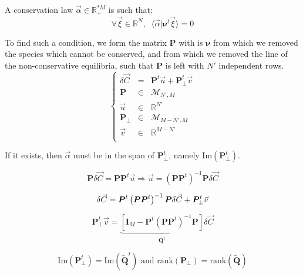 \documentclass[aps,12pt]{revtex4}
\begin{document}
A conservation law $\vec{\alpha}\in\mathbb{R}_+^{*M}$ is such that:
\begin{equation}
	\forall \vec{\xi} \in \mathbb{R}^N, \;\; \langle \vec{\alpha} \vert \bm{\nu}^t \vec{\xi} \rangle = 0
\end{equation}

To find such a condition, we form the matrix $\bm{P}$ with is $\bm{\nu}$ from which we removed the species
which cannot be conserved, and from which we removed the line of the non-conservative equilibria, 
such that $\bm{P}$ is left with $N'$ independent rows.
\begin{equation}
\left \lbrace
\begin{array}{rcl}
\delta\vec{C} & = & \bm{P}^t\vec{u} + \bm{P}_\perp^t \vec{v} \\
\bm{P}       & \in & \mathcal{M}_{N',M}\\
\vec{u}      & \in & \mathbb{R}^{N'}\\
\bm{P}_\perp & \in & \mathcal{M}_{M-N',M}\\
\vec{v}      & \in & \mathbb{R}^{M-N'}     \\
\end{array}
\right .
\end{equation}

If it exists, then $\vec{\alpha}$ must be in the span of $\bm{P}_\perp^t$, namely $\mathrm{Im}\left(\bm{P}_\perp^t\right)$.

\begin{equation}
	\bm{P} \delta \vec{C} = \bm{P}\bm{P}^t\vec{u}
	 \Rightarrow \vec{u} = \left(\bm{P}\bm{P}^t\right)^{-1} \bm{P} \delta \vec{C}
\end{equation}

\begin{equation}
	\delta\vec{C} =  \bm{P}^t\left(\bm{P}\bm{P}^t\right)^{-1} \bm{P} \delta \vec{C} + \bm{P}_\perp^t \vec{v}\\
\end{equation}
	
\begin{equation}
	\bm{P}_\perp^t \vec{v} = 
	\underbrace{\left\lbrack \bm{I}_M - \bm{P}^t\left(\bm{P}\bm{P}^t\right)^{-1} \bm{P} \right\rbrack}_{\bm{Q}^t} \delta\vec{C}
\end{equation}

\begin{equation}
	\mathrm{Im}\left(\bm{P}_\perp^t\right) = \mathrm{Im}\left(\bm{\tilde Q}^t\right) \text{ and }
	\mathrm{rank}(\bm{P}_\perp) = \mathrm{rank}(\bm{\tilde Q})
\end{equation}
\end{document}
